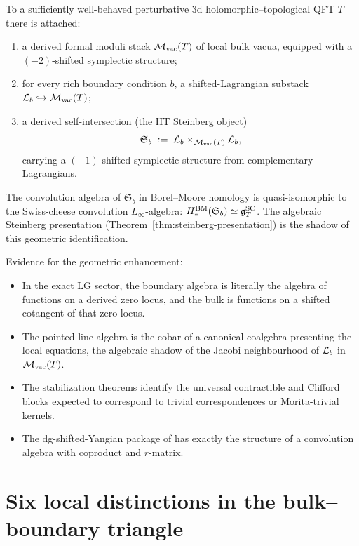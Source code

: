 \begin{conjecture}
To a sufficiently well-behaved perturbative 3d
holomorphic--topological QFT $T$ there is attached:
\begin{enumerate}[label=\textup{(\alph*)}]
\item a derived formal moduli stack $\mathcal M_{\mathrm{vac}}(T)$ of
 local bulk vacua, equipped with a $(-2)$-shifted symplectic
 structure;
\item for every rich boundary condition $b$, a shifted-Lagrangian
 substack $\mathcal L_b \hookrightarrow \mathcal M_{\mathrm{vac}}(T)$;
\item a derived self-intersection (the HT Steinberg object)
 \[
 \mathfrak S_b
 \;:=\;
 \mathcal L_b \times_{\mathcal M_{\mathrm{vac}}(T)} \mathcal L_b,
 \]
 carrying a $(-1)$-shifted symplectic structure from
 complementary Lagrangians.
\end{enumerate}
The convolution algebra of $\mathfrak S_b$ in Borel--Moore homology
is quasi-isomorphic to the Swiss-cheese convolution $L_\infty$-algebra:
$H_*^{\mathrm{BM}}(\mathfrak S_b) \simeq \mathfrak{g}^{\mathrm{SC}}_T$.
The algebraic Steinberg presentation
\textup{(}Theorem~\textup{\ref{thm:steinberg-presentation}}\textup{)}
is the shadow of this geometric identification.
\end{conjecture}

Evidence for the geometric enhancement:
\begin{itemize}[leftmargin=1.8em]
\item In the exact LG sector, the boundary algebra is literally
 the algebra of functions on a derived zero locus, and the bulk
 is functions on a shifted cotangent of that zero locus.
\item The pointed line algebra is the cobar of a canonical coalgebra
 presenting the local equations, the algebraic shadow of the
 Jacobi neighbourhood of $\mathcal L_b$ in $\mathcal M_{\mathrm{vac}}(T)$.
\item The stabilization theorems identify the universal contractible
 and Clifford blocks expected to correspond to trivial
 correspondences or Morita-trivial kernels.
\item The dg-shifted-Yangian package of \cite{DNP25} has exactly
 the structure of a convolution algebra with coproduct and
 $r$-matrix.
\end{itemize}


\section{Six local distinctions in the bulk--boundary triangle}

